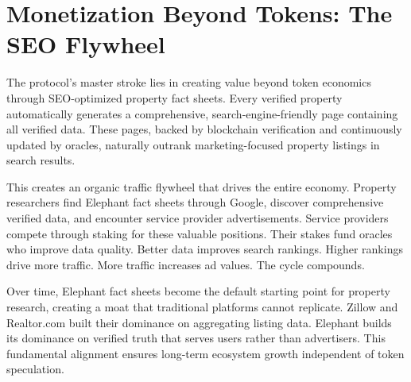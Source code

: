 \section{Monetization Beyond Tokens: The SEO Flywheel}

The protocol's master stroke lies in creating value beyond token economics through SEO-optimized property fact sheets. Every verified property automatically generates a comprehensive, search-engine-friendly page containing all verified data. These pages, backed by blockchain verification and continuously updated by oracles, naturally outrank marketing-focused property listings in search results.

This creates an organic traffic flywheel that drives the entire economy. Property researchers find Elephant fact sheets through Google, discover comprehensive verified data, and encounter service provider advertisements. Service providers compete through staking for these valuable positions. Their stakes fund oracles who improve data quality. Better data improves search rankings. Higher rankings drive more traffic. More traffic increases ad values. The cycle compounds.

Over time, Elephant fact sheets become the default starting point for property research, creating a moat that traditional platforms cannot replicate. Zillow and Realtor.com built their dominance on aggregating listing data. Elephant builds its dominance on verified truth that serves users rather than advertisers. This fundamental alignment ensures long-term ecosystem growth independent of token speculation.

